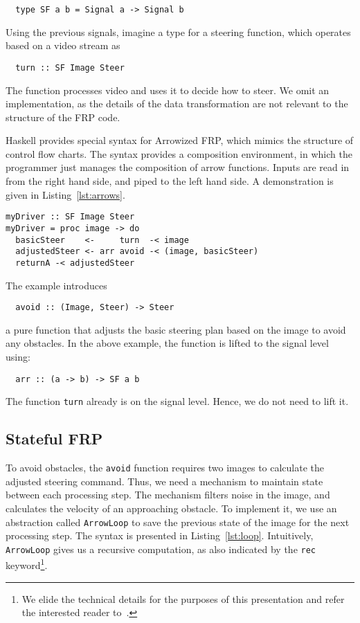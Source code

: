 \begin{lstlisting}
  type SF a b = Signal a -> Signal b
\end{lstlisting}

\noindent Using the previous signals, imagine a type for a steering function, which operates based on a video stream as

\begin{lstlisting}
  turn :: SF Image Steer
\end{lstlisting}

\noindent The function processes video and uses it to decide how to steer.
We omit an implementation, as the details of the data transformation are not relevant to the structure of the FRP code.

Haskell provides special syntax for Arrowized FRP, which mimics the structure of control flow charts.
The syntax provides a composition environment, in which the programmer just manages the composition of arrow functions.
Inputs are read in from the right hand side, and piped to the left hand side.
A demonstration is given in Listing~\ref{lst:arrows}.

\begin{lstlisting}[float,floatplacement=h!,caption=Basic Arrowized FRP syntax,label=lst:arrows]
myDriver :: SF Image Steer
myDriver = proc image -> do
  basicSteer    <-     turn  -< image
  adjustedSteer <- arr avoid -< (image, basicSteer)
  returnA -< adjustedSteer
\end{lstlisting}

The example introduces 
%
\begin{lstlisting}
  avoid :: (Image, Steer) -> Steer
\end{lstlisting}
%
a pure function that adjusts the basic steering plan based on the image to avoid any obstacles.
In the above example, the function is lifted to the signal level using:
%
\begin{lstlisting}
  arr :: (a -> b) -> SF a b
\end{lstlisting}
%
The function \texttt{turn} already is on the signal level. Hence, we do not need to lift it.

\subsection{Stateful FRP}

To avoid obstacles, the \texttt{avoid} function requires two images to calculate the adjusted steering command. 
Thus, we need a mechanism to maintain state between each processing step.
The mechanism filters noise in the image, and calculates the velocity of an approaching obstacle.
To implement it, we use an abstraction called \texttt{ArrowLoop} to  save the previous state of the image for the next processing step.
The syntax is presented in Listing~\ref{lst:loop}.
Intuitively, \texttt{ArrowLoop} gives us a recursive computation, as also indicated by the \texttt{rec} keyword\footnote{We elide the technical details for the purposes of this presentation and refer the interested reader to~\cite{paterson2001icfp}.}.



